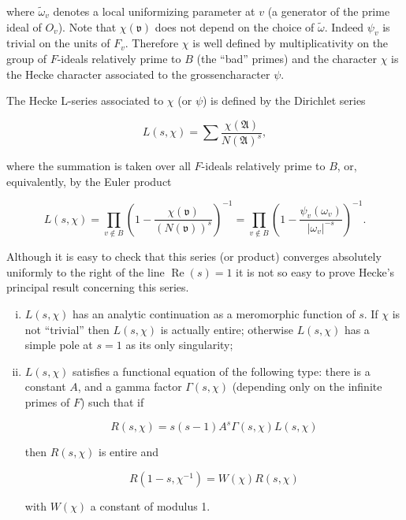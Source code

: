 where $\tilde{\omega}_v$ denotes a local uniformizing parameter at $v$ (a generator of the prime ideal of $O_v$). Note that $\chi(\mathfrak{v})$ does not depend on the choice of $\tilde{\omega}$. Indeed $\psi_v$ is trivial on the units of $F_v$. Therefore $\chi$ is well defined by multiplicativity on the group of $F$-ideals relatively prime to $B$ (the ``bad'' primes) and the character $\chi$ is the Hecke character associated to the grossencharacter $\psi$.

The Hecke L-series associated to $\chi$ (or $\psi$) is defined by the Dirichlet series

\begin{equation}\label{eq:6.7}
L(s, \chi) = \sum \frac{\chi(\mathfrak{A})}{N(\mathfrak{A})^s},\tag{6.7}
\end{equation}

where the summation is taken over all $F$-ideals relatively prime to $B$, or, equivalently, by the Euler product

\begin{equation}\label{eq:6.8}
L(s, \chi) = \prod_{v \notin B} \left(1 - \frac{\chi(\mathfrak{v})}{(N(\mathfrak{v}))^s}\right)^{-1} = \prod_{v \notin B} \left(1 - \frac{\psi_v(\omega_v)}{|\omega_v|^{-s}}\right)^{-1}.\tag{6.8}
\end{equation}

Although it is easy to check that this series (or product) converges absolutely uniformly to the right of the line $\operatorname{Re}(s) = 1$ it is not so easy to prove Hecke's principal result concerning this series.

\begin{theorem}\label{thm:6.2}

\begin{enumerate}[(i)]

\item $L(s,\chi)$ has an analytic continuation as a meromorphic function of $s$. If $\chi$ is not ``trivial'' then $L(s,\chi)$ is actually entire; otherwise $L(s,\chi)$ has a simple pole at $s = 1$ as its only singularity;

\item $L(s,\chi)$ satisfies a functional equation of the following type: there is a constant $A$, and a gamma factor $\Gamma(s,\chi)$ (depending only on the infinite primes of $F$) such that if

\[
R(s,\chi) = s(s-1)A^s\Gamma(s,\chi)L(s,\chi)
\]

then $R(s,\chi)$ is entire and

\begin{equation}\label{eq:6.9}
R(1 - s, \chi^{-1}) = W(\chi) R(s, \chi)\tag{6.9}
\end{equation}

with $W(\chi)$ a constant of modulus 1.

\end{enumerate}

\end{theorem}

